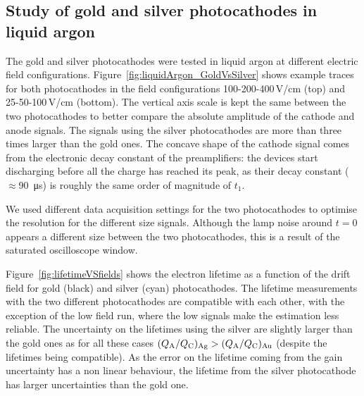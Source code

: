 \documentclass[a4paper,11pt]{article}
\newcommand{\QC}{\ensuremath{Q_{\rm C}}\xspace}
\newcommand{\QA}{\ensuremath{Q_{\rm A}}\xspace}
\begin{document}
\subsection{Study of gold and silver photocathodes in liquid argon}
The gold and silver photocathodes were tested in liquid argon at different electric field configurations.
Figure~\ref{fig:liquidArgon_GoldVsSilver} shows example traces for both photocathodes in the field configurations 100-200-400\,V/cm (top) and 25-50-100\,V/cm (bottom).
The vertical axis scale is kept the same between the two photocathodes to better compare the absolute amplitude of the cathode and anode signals. The signals using the silver photocathodes are more than three times larger than the gold ones. The concave shape of the cathode signal comes from the electronic decay constant of the preamplifiers: the devices start discharging before all the charge has reached its peak, as their decay constant ($\approx$\SI{90}{\micro\second}) is roughly the same order of magnitude of $t_1$.

We used different data acquisition settings for the two photocathodes to optimise the resolution for the different size signals. Although the lamp noise around $t=0$ appears a different size between the two photocathodes, this is a result of the saturated oscilloscope window.

Figure~\ref{fig:lifetimeVSfields} shows the electron lifetime as a function of the drift field for gold (black) and silver (cyan) photocathodes. 
The lifetime measurements with the two different photocathodes are compatible with each other, with the exception of the low field run, where the low signals make the estimation less reliable.
The uncertainty on the lifetimes using the silver are slightly larger than the gold ones as for all these cases $(\QA/\QC)_{\rm Ag} > (\QA/\QC)_{\rm Au}$ (despite the lifetimes being compatible). 
As the error on the lifetime coming from the gain uncertainty has a non linear behaviour, the lifetime from the silver photocathode has larger uncertainties than the gold one.
\end{document}
